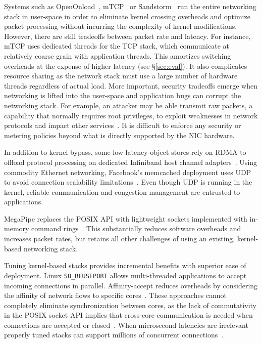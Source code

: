  Systems such as
OpenOnload~\cite{openonload}, mTCP~\cite{jeong2014mtcp} or
Sandstorm~\cite{sandstorm} run the entire networking stack in
user-space in order to eliminate kernel crossing overheads and
optimize packet processing without incurring the complexity of kernel
modifications. However, there are still tradeoffs between packet rate
and latency. For instance, mTCP uses dedicated threads for the TCP
stack, which communicate at relatively coarse grain with application
threads. This amortizes switching overheads at the expense of higher
latency (see \S\ref{sec:eval}). It also complicates resource sharing
as the network stack must use a large number of hardware threads
regardless of actual load. More important, security tradeoffs emerge
when networking is lifted into the user-space and application bugs can
corrupt the networking stack. For example, an attacker may be able
transmit raw packets, a capability that normally requires root
privileges, to exploit weaknesses in network protocols and impact
other services~\cite{DBLP:conf/acsac/Bellovin04}. It is difficult to
enforce any security or metering policies beyond what is directly
supported by the NIC hardware.

 In addition to kernel bypass, some
low-latency object stores rely on RDMA to offload protocol processing
on dedicated Infiniband host channel
adapters~\cite{dragojevic14farm,DBLP:conf/icpp/JoseSLZHWIOWSP11,mitchell:rdma,DBLP:conf/sosp/OngaroRSOR11}.
 Using commodity Ethernet
networking, Facebook's memcached deployment uses UDP to avoid
connection scalability
limitations~\cite{DBLP:conf/nsdi/NishtalaFGKLLMPPSSTV13}. Even though
UDP is running in the kernel, reliable communication and congestion
management are entrusted to applications.

 MegaPipe replaces the POSIX
API with lightweight sockets implemented with in-memory command
rings~\cite{DBLP:conf/osdi/HanMCR12}. This substantially reduces
software overheads and increases packet rates, but retains all other
challenges of using an existing, kernel-based networking stack.

 Tuning kernel-based stacks provides
incremental benefits with superior ease of deployment.  Linux
\texttt{SO\_REUSEPORT} allows multi-threaded applications to accept
incoming connections in parallel. Affinity-accept reduces overheads by
considering the affinity of network flows to specific
cores~\cite{DBLP:conf/eurosys/PesterevSZM12}. These approaches cannot
completely eliminate synchronization between cores, as the lack of
commutativity in the POSIX socket API implies that cross-core
communication is needed when connections are accepted or
closed~\cite{DBLP:conf/sosp/ClementsKZMK13}. When microsecond
latencies are
irrelevant %
properly tuned stacks can support millions of concurrent
connections~\cite{whatsapp-2mil}.
